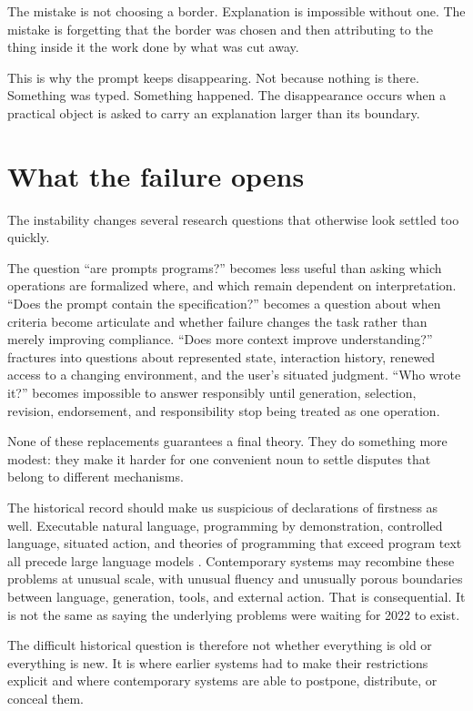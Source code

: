 \documentclass[11pt]{article}
\begin{document}
The mistake is not choosing a border. Explanation is impossible without one. The mistake is forgetting that the border was chosen and then attributing to the thing inside it the work done by what was cut away.

This is why the prompt keeps disappearing. Not because nothing is there. Something was typed. Something happened. The disappearance occurs when a practical object is asked to carry an explanation larger than its boundary.

\section{What the failure opens}

The instability changes several research questions that otherwise look settled too quickly.

The question ``are prompts programs?'' becomes less useful than asking which operations are formalized where, and which remain dependent on interpretation. ``Does the prompt contain the specification?'' becomes a question about when criteria become articulate and whether failure changes the task rather than merely improving compliance. ``Does more context improve understanding?'' fractures into questions about represented state, interaction history, renewed access to a changing environment, and the user's situated judgment. ``Who wrote it?'' becomes impossible to answer responsibly until generation, selection, revision, endorsement, and responsibility stop being treated as one operation.

None of these replacements guarantees a final theory. They do something more modest: they make it harder for one convenient noun to settle disputes that belong to different mechanisms.

The historical record should make us suspicious of declarations of firstness as well. Executable natural language, programming by demonstration, controlled language, situated action, and theories of programming that exceed program text all precede large language models \parencite{winograd1973procedural,smith1993pygmalion,fuchs1996ace,suchman1985plans,naur1985programming}. Contemporary systems may recombine these problems at unusual scale, with unusual fluency and unusually porous boundaries between language, generation, tools, and external action. That is consequential. It is not the same as saying the underlying problems were waiting for 2022 to exist.

The difficult historical question is therefore not whether everything is old or everything is new. It is where earlier systems had to make their restrictions explicit and where contemporary systems are able to postpone, distribute, or conceal them.
\end{document}
